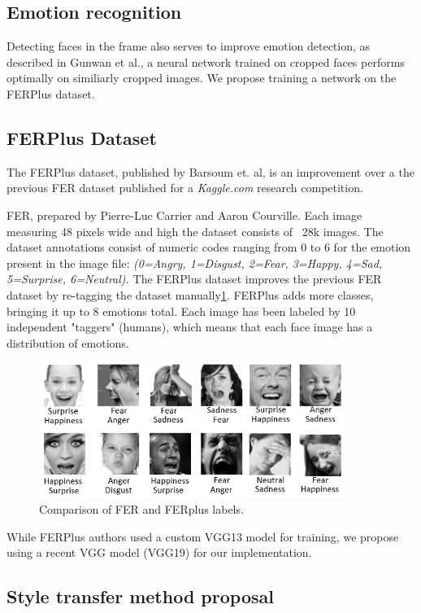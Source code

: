 \subsection{Emotion recognition}
Detecting faces in the frame also serves to improve emotion detection, as described in Gunwan et al.\cite{haarcrop}, a neural network trained on cropped faces performs optimally on similiarly cropped images. We propose training a network on the FERPlus\cite{BarsoumICMI2016} dataset.


\subsection{FERPlus Dataset}

The FERPlus dataset, published by Barsoum et. al\cite{BarsoumICMI2016}, is an improvement over a the previous FER\cite{FER2013} dataset published for a \emph{Kaggle.com} research competition.

FER, prepared by Pierre-Luc Carrier and Aaron Courville. Each image measuring 48 pixels wide and high the dataset consists of ~28k images. The dataset annotations consist of numeric codes ranging from 0 to 6 for the emotion present in the image file: \emph{(0=Angry, 1=Disgust, 2=Fear, 3=Happy, 4=Sad, 5=Surprise, 6=Neutral).}
The FERPlus dataset improves the previous FER dataset by re-tagging the dataset manually\ref{fig:fervsferplus}. FERPlus adds more classes, bringing it up to 8 emotions total. Each image has been labeled by 10 independent "taggers" (humans), which means that each face image has a distribution of emotions.


\begin{figure}[h]
  \centering
  \includegraphics[width=10cm]{resources/fervsferplus.png}
  \caption{Comparison of FER and FERplus labels.}\label{fig:fervsferplus}
\end{figure}


While FERPlus authors used a custom VGG13 model for training, we propose using a recent VGG model (VGG19) for our implementation. 


\subsection{Style transfer method proposal}

